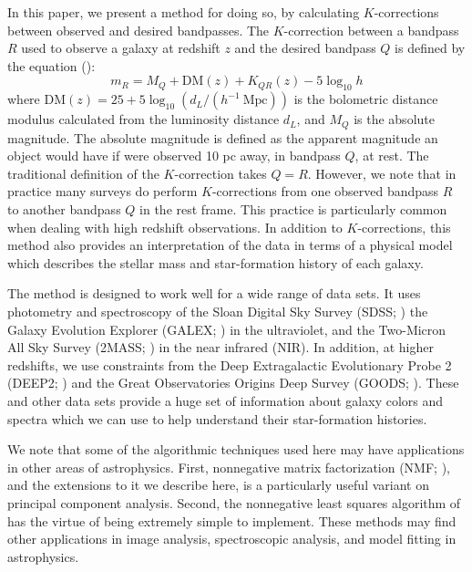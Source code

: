 \documentclass[10pt,preprint]{aastex}
\begin{document}
In this paper, we present a method for doing so, by calculating
$K$-corrections between observed and desired bandpasses.  The
$K$-correction between a bandpass $R$ used to observe a galaxy at
redshift $z$ and the desired bandpass $Q$ is defined by the equation
(\citealt{oke68a, hogg02a}):
\begin{equation}
m_R = M_Q + \mathrm{DM}(z) + K_{QR}(z) - 5 \log_{10} h 
\end{equation}
where $\mathrm{DM}(z) = 25 + 5\log_{10} (d_L / (h^{-1}{\mathrm{~Mpc}}))$ is the
bolometric distance modulus calculated from the luminosity distance
$d_L$, and $M_Q$ is the absolute magnitude. The absolute magnitude is
defined as the apparent magnitude an object would have if were
observed 10 pc away, in bandpass $Q$, at rest.  The traditional
definition of the $K$-correction takes $Q=R$. However, we note that in
practice many surveys do perform $K$-corrections from one observed
bandpass $R$ to another bandpass $Q$ in the rest frame. This practice
is particularly common when dealing with high redshift observations.
In addition to $K$-corrections, this method also provides an
interpretation of the data in terms of a physical model which
describes the stellar mass and star-formation history of each galaxy.

The method is designed to work well for a wide range of data sets.  It
uses photometry and spectroscopy of the Sloan Digital Sky Survey
(SDSS; \citealt{york00a}) the Galaxy Evolution Explorer (GALEX;
\citealt{martin05a}) in the ultraviolet, and the Two-Micron All Sky
Survey (2MASS; \citealt{skrutskie97a}) in the near infrared (NIR). In
addition, at higher redshifts, we use constraints from the Deep
Extragalactic Evolutionary Probe 2 (DEEP2; \citealt{davis03a,
faber03a}) and the Great Observatories Origins Deep Survey (GOODS;
\citealt{giavalisco04a}).  These and other data sets provide a huge
set of information about galaxy colors and spectra which we can use to
help understand their star-formation histories.

We note that some of the algorithmic techniques used here may have
applications in other areas of astrophysics. First, nonnegative matrix
factorization (NMF; \citealt{lee00a}), and the extensions to it we
describe here, is a particularly useful variant on principal component
analysis. Second, the nonnegative least squares algorithm of
\citet{sha02a} has the virtue of being extremely simple to implement.
These methods may find other applications in image analysis, spectroscopic
analysis, and model fitting in astrophysics.
\end{document}
